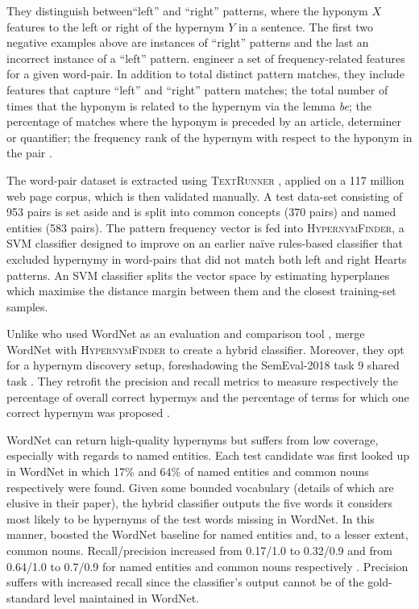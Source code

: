 They distinguish between``left'' and ``right'' patterns, where the hyponym $X$ features to the left or right of the hypernym $Y$ in a sentence.  The first two negative examples above are instances of ``right'' patterns and the last an incorrect instance of a ``left'' pattern.  \citeauthor{ritter2009anyway} engineer a set of frequency-related features for a given word-pair.  In addition to total distinct pattern matches, they include features that capture ``left'' and ``right'' pattern matches; the total number of times that the hyponym is related to the hypernym via the lemma \textit{be}; the percentage of matches where the hyponym is preceded by an article, determiner or quantifier; the frequency rank of the hypernym with respect to the hyponym in the pair \citep{ritter2009anyway}.   

The word-pair dataset is extracted using \textsc{TextRunner} \citep{banko2007open}, applied on a 117 million web page corpus, which is then validated manually.  A test data-set consisting of 953 pairs is set aside and is split into common concepts (370 pairs) and named entities (583 pairs).  The pattern frequency vector is fed into \textsc{HypernymFinder}, a \ac{SVM} classifier \citep{platt1999probabilistic} designed to improve on an earlier na\"ive rules-based classifier that excluded hypernymy in word-pairs that did not match both left and right Hearts patterns.  An \ac{SVM} classifier splits the vector space by estimating hyperplanes which maximise the distance margin between them and the closest training-set samples.    

Unlike \citeauthor{Snow2004} who used WordNet as an evaluation and comparison tool \citep{Snow2004}, \citeauthor{ritter2009anyway} merge WordNet with \textsc{HypernymFinder} to create a hybrid classifier.  
Moreover, they opt for a hypernym discovery setup, foreshadowing the SemEval-2018 task 9 shared task \citep{camacho2018semeval}.  They retrofit the precision and recall metrics to measure respectively the percentage of overall correct hypermys and the percentage of terms for which one correct hypernym was proposed \citep{ritter2009anyway}.  

WordNet can return high-quality hypernyms but suffers from low coverage, especially with regards to named entities.  Each test candidate was first looked up in WordNet in which 17\% and 64\% of named entities and common nouns respectively were found.  Given some bounded vocabulary (details of which are elusive in their paper), the hybrid classifier outputs the five words it considers most likely to be hypernyms of the test words missing in WordNet.  In this manner, \citeauthor{ritter2009anyway} boosted the WordNet baseline for named entities and, to a lesser extent, common nouns.  Recall/precision increased from 0.17/1.0 to 0.32/0.9 and from 0.64/1.0 to 0.7/0.9 for named entities and common nouns respectively \citep{ritter2009anyway}.  Precision suffers with increased recall since the classifier’s output cannot be of the gold-standard level maintained in WordNet.

